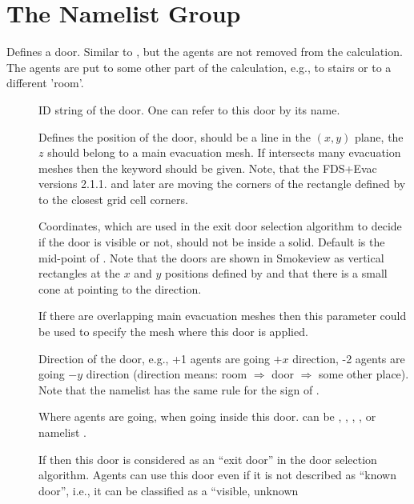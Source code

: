 \documentclass[12pt,a4paper,final,twoside]{stylevk}
\begin{document}
\section{The  Namelist Group}\label{Sec_DoorNML}

\noindent Defines a door.  Similar to , but the agents are
not removed from the calculation.  The agents are put to some other
part of the calculation, e.g., to stairs or to a different
'room'.

\begin{description}
%
\item[] ID string of the door. One can refer to this door by
  its name.
%
\item[] Defines the position of the door, should be a line in
  the $(x,y)$ plane, the $z$ should belong to a main evacuation mesh.
  If  intersects many evacuation meshes then the keyword
   should be given.  Note, that the FDS+Evac versions
  2.1.1. and later are moving the corners of the rectangle defined by
   to the closest grid cell corners.
%
\item[] Coordinates, which are used in the exit door
  selection algorithm to decide if the door is visible or not, should
  not be inside a solid.  Default is the mid-point of .
  Note that the doors are shown in Smokeview as vertical rectangles at
  the $x$ and $y$ positions defined by  and that there is a
  small cone at  pointing to the  direction.
%
\item[] If there are overlapping main evacuation
  meshes then this parameter could be used to specify the mesh where
  this door is applied.
%
\item[] Direction of the door, e.g., +1 agents are
  going $+x$ direction, -2 agents are going $-y$ direction (direction
  means: room $\Rightarrow$ door $\Rightarrow$ some other place).
  Note that the namelist  has the same rule for the sign
  of .
%
\item[] Where agents are going, when going inside this
  door.   can be , ,
  , , or  namelist .
%
\item[] If  then this door is
  considered as an ``exit door'' in the door selection algorithm.
  Agents can use this door even if it is not described as ``known
  door'', i.e., it can be classified as a ``visible, unknown

\end{description}
\end{document}
